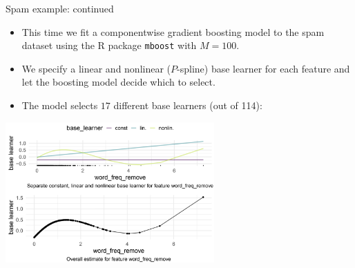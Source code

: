 
\begin{vbframe}{Spam example: continued}

\begin{itemize}
  \item This time we fit a componentwise gradient boosting model to the spam 
  dataset using the R package \texttt{mboost} with $M = 100$.
  \item We specify a linear and nonlinear ($P$-spline) base learner for each 
  feature and let the boosting model decide which to select.
  \item The model selects $17$ different base learners (out of 114):
\end{itemize}

\begin{center}
\includegraphics[width=0.6\textwidth]{figure_man/spam-example.png}
\end{center}



\end{vbframe}


